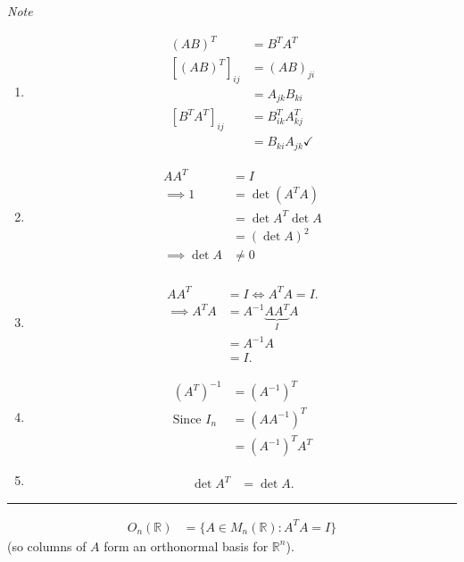 \emph{Note}
\begin{enumerate}
    \item
    \begin{align*}
        (AB)^T &= B^T A^T \\
        [(AB)^T]_{ij} &= (AB)_{ji} \\
        &= A_{jk}B_{ki} \\
        [B^T A^T]_{ij} &= B^T_{ik} A^T_{kj} \\
        &= B_{ki} A_{jk} \checkmark
    \end{align*} 
    \item \begin{align*}
        A A^T &= I \\
        \implies 1 &= \det (A^T A) \\
        &= \det A^T \det A \\
        &= (\det A)^2 \\
        \implies \det A &\neq 0 \\
    \end{align*}
    \item \begin{align*}
        A A^T &= I \iff A^T A = I. \\
        \implies A^T A &= A^{-1} \underbrace{A A^T}_I A \\
        &= A^{-1} A \\
        &= I.
    \end{align*} 
    \item
    \begin{align*}
        (A^T)^{-1} &= (A^{-1})^T \\
        \text{Since } I_n &= (A A^{-1})^T \\
        &= (A^{-1})^T A^T
    \end{align*} 
    \item \begin{align*}
        \det A^T &= \det A.
    \end{align*} 
\end{enumerate} 

\begin{center}\rule{\linewidth}{0.5pt}\end{center}

\begin{definition}
    \begin{align*}
        O_n(\mathbb{R}) &= \{ A \in M_n(\mathbb{R}) : A^T A = I\}
    \end{align*} (so columns of $A$ form an orthonormal basis for $\mathbb{R}^n$).  
\end{definition} 

